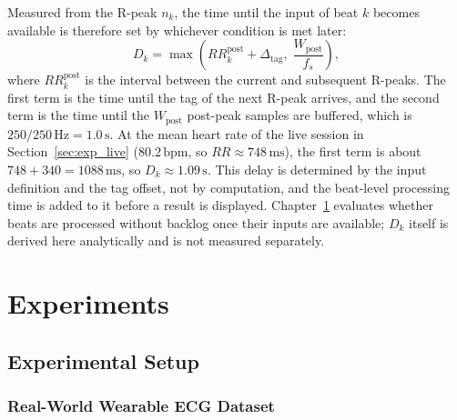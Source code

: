 Measured from the R-peak $n_k$, the time until the input of beat $k$ becomes available is therefore set by whichever condition is met later:
\begin{equation}
D_k =
\max\left(
RR_k^{\mathrm{post}}+\Delta_{\mathrm{tag}},\;
\frac{W_{\mathrm{post}}}{f_s}
\right),
\label{eq:input_wait}
\end{equation}
where $RR_k^{\mathrm{post}}$ is the interval between the current and subsequent R-peaks.
The first term is the time until the tag of the next R-peak arrives, and the second term is the time until the $W_{\mathrm{post}}$ post-peak samples are buffered, which is $250/250\,\mathrm{Hz}=1.0\,\mathrm{s}$.
At the mean heart rate of the live session in Section~\ref{sec:exp_live} ($80.2\,\mathrm{bpm}$, so $RR\approx748\,\mathrm{ms}$), the first term is about $748+340=1088\,\mathrm{ms}$, so $D_k\approx1.09\,\mathrm{s}$.
This delay is determined by the input definition and the tag offset, not by computation, and the beat-level processing time is added to it before a result is displayed.
Chapter~\ref{ch:experiments} evaluates whether beats are processed without backlog once their inputs are available; $D_k$ itself is derived here analytically and is not measured separately.
\chapter{Experiments}
\label{ch:experiments}

\section{Experimental Setup}

\subsection{Real-World Wearable ECG Dataset}
\label{sec:exp_dataset}

